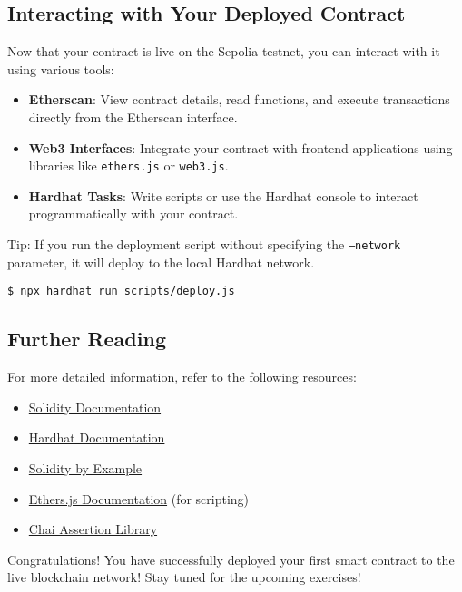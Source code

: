 \documentclass[12pt]{article}
\begin{document}
\subsection{Interacting with Your Deployed Contract}

Now that your contract is live on the Sepolia testnet, you can interact with it using various tools:

\begin{itemize}
    \item \textbf{Etherscan}: View contract details, read functions, and execute transactions directly from the Etherscan interface.
    
    \item \textbf{Web3 Interfaces}: Integrate your contract with frontend applications using libraries like \texttt{ethers.js} or \texttt{web3.js}.
    
    \item \textbf{Hardhat Tasks}: Write scripts or use the Hardhat console to interact programmatically with your contract.
\end{itemize}
Tip: If you run the deployment script without specifying the \texttt{--network} parameter, it will deploy to the local Hardhat network.
\begin{verbatim}
$ npx hardhat run scripts/deploy.js
\end{verbatim}

\subsection{Further Reading}

For more detailed information, refer to the following resources:

\begin{itemize}
    \item \href{https://docs.soliditylang.org/en/latest/}{Solidity Documentation}
    \item \href{https://hardhat.org/docs}{Hardhat Documentation}
    \item \href{https://solidity-by-example.org/}{Solidity by Example}
    \item \href{https://docs.ethers.org/v6/}{Ethers.js Documentation} (for scripting)
    \item \href{https://www.chaijs.com/}{Chai Assertion Library}

\end{itemize}
Congratulations! You have successfully deployed your first smart contract to the live blockchain network! Stay tuned for the upcoming exercises!
\end{document}
